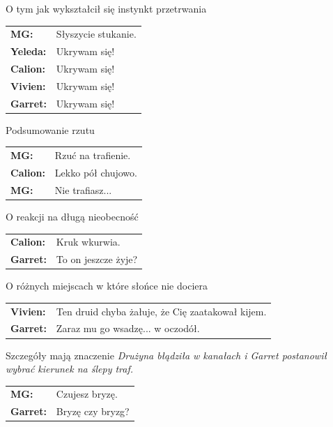 \documentclass[10pt,twoside,twocolumn]{book}
\begin{document}
\begin{rpg-quotebox}{O tym jak wykształcił się instynkt przetrwania}
   \begin{tabularx}{\columnwidth}{lX}
      \textbf{MG:} & Słyszycie stukanie.\\
      \textbf{Yeleda:} & Ukrywam się!\\
      \textbf{Calion:} & Ukrywam się!\\
      \textbf{Vivien:} & Ukrywam się! \\
      \textbf{Garret:} & Ukrywam się!\\
   \end{tabularx}
\end{rpg-quotebox}


\begin{rpg-quotebox}{Podsumowanie rzutu}
   \begin{tabularx}{\columnwidth}{lX}
      \textbf{MG:} & Rzuć na trafienie.\\
      \textbf{Calion:} & Lekko pół chujowo.\\
      \textbf{MG:} & Nie trafiasz...\\
   \end{tabularx}
\end{rpg-quotebox}

\begin{rpg-quotebox}{O reakcji na długą nieobecność}
   \begin{tabularx}{\columnwidth}{lX}
      \textbf{Calion:} & Kruk wkurwia.\\
      \textbf{Garret:} & To on jeszcze żyje?\\
   \end{tabularx}
\end{rpg-quotebox}

\begin{rpg-quotebox}{O różnych miejscach w które słońce nie dociera}
   \begin{tabularx}{\columnwidth}{lX}
      \textbf{Vivien:} & Ten druid chyba żałuje, że Cię zaatakował kijem.\\
      \textbf{Garret:} & Zaraz mu go wsadzę... w oczodół.\\
   \end{tabularx}
\end{rpg-quotebox}

\begin{rpg-quotebox}{Szczegóły mają znaczenie}
   \textit{Drużyna błądziła w kanałach i Garret postanowił wybrać kierunek na ślepy traf.}\\

   \begin{tabularx}{\columnwidth}{lX}
      \textbf{MG:} & Czujesz bryzę.\\
      \textbf{Garret:} & Bryzę czy bryzg?\\
   \end{tabularx}
\end{rpg-quotebox}
\end{document}
